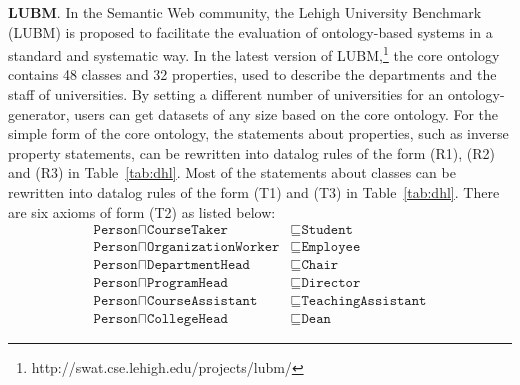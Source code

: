 \textbf{LUBM}. In the Semantic Web community,
the Lehigh University Benchmark (LUBM) is proposed to
facilitate the evaluation of ontology-based systems
in a standard and systematic way.
In the latest version of LUBM,\footnote{http://swat.cse.lehigh.edu/projects/lubm/}
the core ontology contains 48 classes and 32 properties, used to describe the departments and the staff of
universities. By setting a different number of universities for an ontology-generator, users can get datasets of any size based on the core ontology.
%
For the simple form of the core ontology,
the statements about properties, such as inverse property statements,
can be rewritten into datalog rules of the form (R1), (R2) and (R3) in Table~\ref{tab:dhl}.
Most of the statements about classes can be rewritten into datalog rules of the form (T1) and (T3)
in Table~\ref{tab:dhl}. There are six axioms of form (T2) as listed below:
\begin{align}
\texttt{Person}\sqcap\texttt{CourseTaker} & \sqsubseteq\texttt{Student}\label{lubm:a1}\tag{$\alpha_1$}\\
\texttt{Person}\sqcap\texttt{OrganizationWorker} & \sqsubseteq\texttt{Employee}\label{lubm:a2}\tag{$\alpha_2$}\\
\texttt{Person}\sqcap\texttt{DepartmentHead} & \sqsubseteq\texttt{Chair}\label{lubm:a3}\tag{$\alpha_3$}\\
\texttt{Person}\sqcap\texttt{ProgramHead} & \sqsubseteq\texttt{Director}\label{lubm:a4}\tag{$\alpha_4$}\\
\texttt{Person}\sqcap\texttt{CourseAssistant} & \sqsubseteq\texttt{TeachingAssistant}\label{lubm:a5}\tag{$\alpha_5$}\\
\texttt{Person}\sqcap\texttt{CollegeHead} & \sqsubseteq\texttt{Dean}\label{lubm:a6}\tag{$\alpha_6$}
\end{align}
